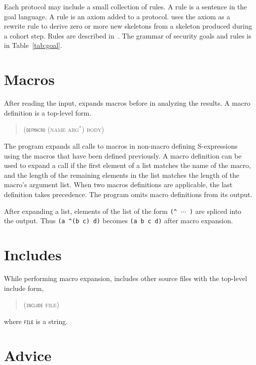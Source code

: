 \documentclass[12pt]{article}
\begin{document}
Each protocol may include a small collection of rules.  A
rule is a sentence in the goal language.  A rule is an axiom added to
a protocol.  {\cpsa} uses the axiom as a rewrite rule to derive zero
or more new skeletons from a skeleton produced during a cohort step.
Rules are described in~\cite{cpsagoals09}.  The grammar of security
goals and rules is in Table~\ref{tab:goal}.

\section{Macros}\label{sec:macros}

After reading the input, {\cpsa} expands macros before in analyzing
the results. A macro definition is a top-level form.

\begin{quote}\scshape
(\texttt{\textup{defmacro}} (name arg${}^\ast$) body)
\end{quote}

The {\cpsa} program expands all calls to macros in non-macro defining
S-expressions using the macros that have been defined previously. A
macro definition can be used to expand a call if the first element of
a list matches the name of the macro, and the length of the remaining
elements in the list matches the length of the macro's argument
list. When two macros definitions are applicable, the last definition
takes precedence. The {\cpsa} program omits macro definitions from its
output.

After expanding a list, elements of the list of the form
\verb|(^ |$\cdots$\verb| )| are spliced into the output.  Thus
\verb|(a ^(b c) d)| becomes \verb|(a b c d)| after macro expansion.

\section{Includes}\label{sec:include}

While performing macro expansion, {\cpsa} includes other source files
with the top-level include form,
\begin{quote}\scshape
(\texttt{\textup{include}} file)
\end{quote}
where \texttt{\scshape file} is a string.

\section{Advice}\label{sec:advice}
\end{document}
